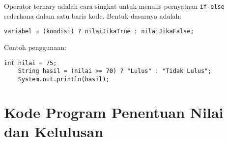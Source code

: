 Operator ternary adalah cara singkat untuk menulis pernyataan \texttt{if-else} sederhana dalam satu baris kode. Bentuk dasarnya adalah:

\begin{lstlisting}[style=JavaStyle]
	variabel = (kondisi) ? nilaiJikaTrue : nilaiJikaFalse;
\end{lstlisting}

Contoh penggunaan:

\begin{lstlisting}[style=JavaStyle]
	int nilai = 75;
	String hasil = (nilai >= 70) ? "Lulus" : "Tidak Lulus";
	System.out.println(hasil);
\end{lstlisting}

\section{Kode Program Penentuan Nilai dan Kelulusan}

